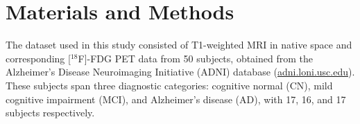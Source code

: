 \chapter{Materials and Methods}
\label{ch:Method}

The dataset used in this study consisted of T1-weighted \gls{MRI} in native space and corresponding [$^{18}$F]-FDG \gls{PET} data from 50 subjects, obtained from the Alzheimer's Disease Neuroimaging Initiative (ADNI) database (\url{adni.loni.usc.edu}). These subjects span three diagnostic categories: cognitive normal (\gls{CN}), mild cognitive impairment (\gls{MCI}), and Alzheimer's disease (\gls{AD}), with 17, 16, and 17 subjects respectively.